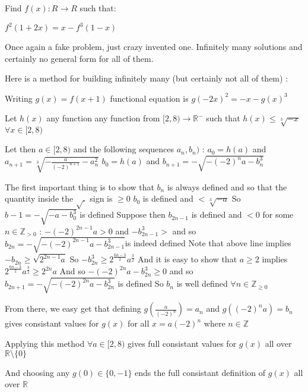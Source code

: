 \begin{solution}
	\begin{tcolorbox}Find $f(x): R \to R$ such that:

$f^2(1+2x)=x-f^3(1-x)$\end{tcolorbox}
Once again a fake problem, just crazy invented one.
Infinitely many solutions and certainly no general form for all of them.

Here is a method for building infinitely many (but certainly not all of them) :

Writing $g(x)=f(x+1)$ functional equation is $g(-2x)^2=-x-g(x)^3$

Let $h(x)$ any function any function from $[2,8)\to\mathbb R^-$ such that $h(x)\le\sqrt[3]{-x}$ $\forall x\in[2,8)$

Let then $a\in[2,8)$ and the following sequences $a_n,b_n)$ :
$a_0=h(a)$ and $a_{n+1}=\sqrt[3]{-\frac a{(-2)^{n+1}}-a_{n}^2}$
$b_0=h(a)$ and $b_{n+1}=-\sqrt{-(-2)^na-b_n^3}$

The first important thing is to show that $b_n$ is always defined and so that the quantity inside the $\sqrt .$ sign is $\ge 0$
$b_0$ is defined and $<\sqrt[3]{-a}$
So $b-1=-\sqrt{-a-b_0^3}$ is defined
Suppose then $b_{2n-1}$ is defined and $<0$ for some $n\in\mathbb Z_{>0}$ :
$-(-2)^{2n-1}a>0$ and $-b_{2n-1}^3>$ and so $b_{2n}=-\sqrt{-(-2)^{2n-1}a-b_{2n-1}^3}$is indeed defined
Note that above line implies $-b_{2n}\ge \sqrt{2^{2n-1}a}$
So $-b_{2n}^3\ge 2^{\frac{6n-3}2}a^{\frac 32}$
And it is easy to show that $a\ge 2$ implies $2^{\frac{6n-3}2}a^{\frac 32}\ge 2^{2n}a$
And so $-(-2)^{2n}a-b_{2n}^3\ge 0$ and so $b_{2n+1}=-\sqrt{-(-2)^{2n}a-b_{2n}^3}$ is defined
So $b_n$ is well defined $\forall n\in\mathbb Z_{\ge 0}$

From there, we easy get that defining $g(\frac a{(-2)^n})=a_n$ and $g((-2)^na)=b_n$
gives consistant values for $g(x)$ for all $x=a(-2)^n$ where $n\in\mathbb Z$

Applying this method $\forall a\in[2,8)$ gives full consistant values for $g(x)$ all over $\mathbb R\setminus\{0\}$

And choosing any $g(0)\in\{0,-1\}$ ends the full consistant definition of $g(x)$ all over $\mathbb R$


\end{solution}



